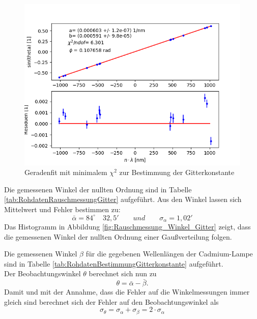 \documentclass[12pt,a4paper]{article}
\begin{document}
	\begin{figure}
		\begin{center}
			\includegraphics[scale=0.9]{Bilder/Anpassung_Gitterkonstante.png}
		\end{center}
		\caption[Fit Gitterkonstante]{Geradenfit mit minimalem $\chi ^2$ zur Bestimmung der Gitterkonstante}
		\label{fig:Fit_Gitterkonstante}
	\end{figure}
	
	Die gemessenen Winkel der nullten Ordnung sind in Tabelle \ref{tab:RohdatenRauschmessungGitter} aufgeführt. Aus den Winkel lassen sich Mittelwert und Fehler bestimmen zu:
	\begin{equation*}
	\bar{\alpha} = 84^{\circ} \quad 32,5' \qquad und \qquad \sigma_{\alpha} = 1,02'
	\end{equation*}
	Das Histogramm in Abbildung \ref{fig:Rauschmessung_Winkel_Gitter} zeigt, dass die gemessenen Winkel der nullten Ordnung einer Gaußverteilung folgen.
	
	Die gemessenen Winkel $\beta$ für die gegebenen Wellenlängen der Cadmium-Lampe sind in Tabelle \ref{tab:RohdatenBestimmungGitterkonstante} aufgeführt.\\
	Der Beobachtungswinkel $\theta$ berechnet sich nun zu 
	\begin{equation}
	\theta = \bar{\alpha} - \bar{\beta}.
	\end{equation}
	Damit und mit der Annahme, dass die Fehler auf die Winkelmessungen immer gleich sind berechnet sich der Fehler auf den Beobachtungswinkel als
	\begin{equation}
	\sigma _{\theta} = \sigma _{\alpha} + \sigma _{\beta} = 2 \cdot \sigma _{\alpha}
	\end{equation}
	
\end{document}
